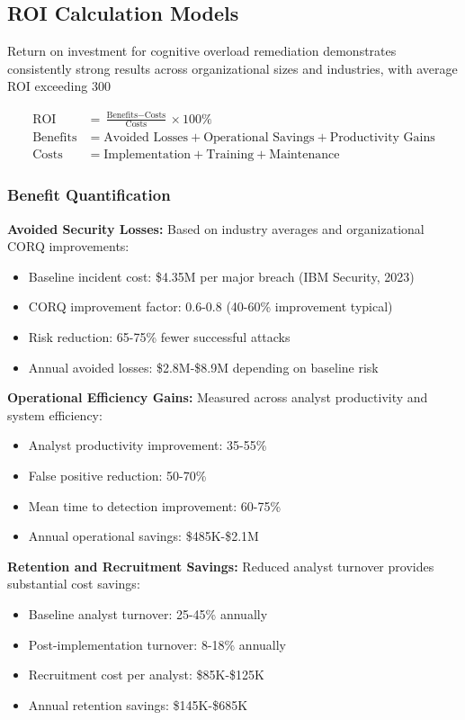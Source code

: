 \documentclass[11pt,a4paper]{article}
\begin{document}
\subsection{ROI Calculation Models}

Return on investment for cognitive overload remediation demonstrates consistently strong results across organizational sizes and industries, with average ROI exceeding 300%

\begin{align}
\text{ROI} &= \frac{\text{Benefits} - \text{Costs}}{\text{Costs}} \times 100\% \\
\text{Benefits} &= \text{Avoided Losses} + \text{Operational Savings} + \text{Productivity Gains} \\
\text{Costs} &= \text{Implementation} + \text{Training} + \text{Maintenance}
\end{align}

\subsubsection{Benefit Quantification}

\textbf{Avoided Security Losses:}
Based on industry averages and organizational CORQ improvements:
\begin{itemize}
\item Baseline incident cost: \$4.35M per major breach (IBM Security, 2023)
\item CORQ improvement factor: 0.6-0.8 (40-60\% improvement typical)
\item Risk reduction: 65-75\% fewer successful attacks
\item Annual avoided losses: \$2.8M-\$8.9M depending on baseline risk
\end{itemize}

\textbf{Operational Efficiency Gains:}
Measured across analyst productivity and system efficiency:
\begin{itemize}
\item Analyst productivity improvement: 35-55\%
\item False positive reduction: 50-70\%
\item Mean time to detection improvement: 60-75\%
\item Annual operational savings: \$485K-\$2.1M
\end{itemize}

\textbf{Retention and Recruitment Savings:}
Reduced analyst turnover provides substantial cost savings:
\begin{itemize}
\item Baseline analyst turnover: 25-45\% annually
\item Post-implementation turnover: 8-18\% annually
\item Recruitment cost per analyst: \$85K-\$125K
\item Annual retention savings: \$145K-\$685K
\end{itemize}
\end{document}
